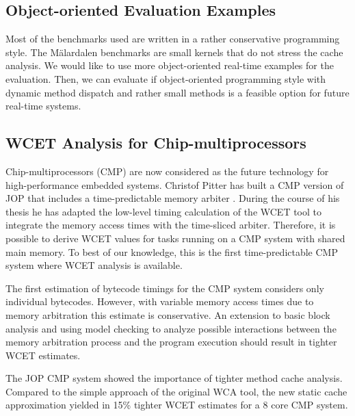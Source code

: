 \subsection{Object-oriented Evaluation Examples}

Most of the benchmarks used are written in a rather conservative
programming style. The M\"alardalen benchmarks are small kernels that
do not stress the cache analysis. We would like to use more
object-oriented real-time examples for the evaluation. Then, we can
evaluate if object-oriented programming style with dynamic method
dispatch and rather small methods is a feasible option for future
real-time systems.

\subsection{WCET Analysis for Chip-multiprocessors}

Chip-multiprocessors (CMP) are now considered as the future
technology for high-performance embedded systems. Christof Pitter has
built a CMP version of JOP that includes a time-predictable memory
arbiter \cite{phd:pitter}. During the course of his thesis he has
adapted the low-level timing calculation of the WCET tool to
integrate the memory access times with the time-sliced arbiter.
Therefore, it is possible to derive WCET values for tasks running on
a CMP system with shared main memory. To best of our knowledge, this
is the first time-predictable CMP system where WCET analysis is
available.

The first estimation of bytecode timings for the CMP system considers
only individual bytecodes. However, with variable memory access times
due to memory arbitration this estimate is conservative. An extension
to basic block analysis and using model checking to analyze possible
interactions between the memory arbitration process and the program
execution should result in tighter WCET estimates.

The JOP CMP system showed the importance of tighter method cache
analysis. Compared to the simple approach of the original WCA tool,
the new static cache approximation yielded in 15\% tighter WCET
estimates for a 8 core CMP system.

